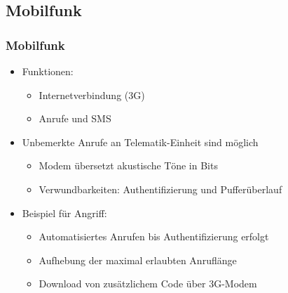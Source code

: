 \documentclass[t]{beamer}
\begin{document}

\subsection{Mobilfunk}
\begin{frame}
	\frametitle{Mobilfunk}
    \begin{itemize}
		\item Funktionen:
        \begin{itemize}

            \item Internetverbindung (3G) %
            \item Anrufe und SMS %
        \end{itemize}
    \end{itemize}

    \begin{itemize}
		\item Unbemerkte Anrufe an Telematik-Einheit sind möglich
        \begin{itemize}
        	\item Modem übersetzt akustische Töne in Bits
            \item Verwundbarkeiten: Authentifizierung und Pufferüberlauf
        \end{itemize}
	\end{itemize}

    \begin{itemize}
        \item Beispiel für Angriff:
        \begin{itemize}
        	\item Automatisiertes Anrufen bis Authentifizierung erfolgt
            \item Aufhebung der maximal erlaubten Anruflänge
            \item Download von zusätzlichem Code über 3G-Modem
        \end{itemize}
    \end{itemize}
 \end{frame}
\end{document}
